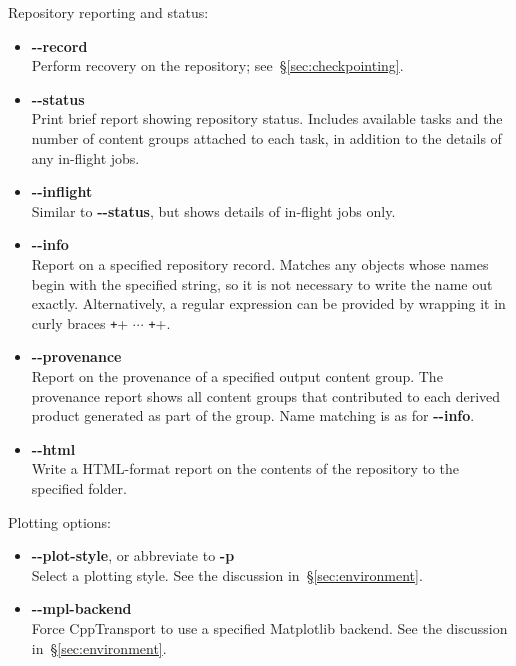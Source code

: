 \documentclass[11pt,a4paper]{article}
\newcommand{\packagefont}{\sffamily}
\newcommand{\CppTransport}{{\packagefont CppTransport}}
\newcommand{\Matplotlib}{{\packagefont Matplotlib}}
\newcommand{\option}[1]{{\ttfamily\bfseries\small #1}}
\begin{document}
\noindent Repository reporting and status:
\begin{itemize}
	\item \option{{-}{-}record} \\
	Perform recovery on the repository; see~\S\ref{sec:checkpointing}.
	
	\item \option{{-}{-}status} \\
	Print brief report showing repository status.
	Includes available tasks and the number of content groups
	attached to each task, in addition to the details of any
	in-flight jobs.
	
	\item \option{{-}{-}inflight} \\
	Similar to \option{{-}{-}status}, but shows details of in-flight jobs only.
	
	\item \option{{-}{-}info} \\
	Report on a specified repository record.
	Matches any objects whose names begin with the specified string, so it is
	not necessary to write the name out exactly.
	Alternatively, a regular expression can be provided by wrapping
	it in curly braces
	\texttt+{+ $\cdots$ \texttt+}+.
	
	\item \option{{-}{-}provenance} \\
	Report on the provenance of a specified output content group.
	The provenance report shows all content groups that contributed
	to each derived product generated as part of the group.
	Name matching is as for \option{{-}{-}info}.
	
	\item \option{{-}{-}html} \\
	Write a HTML-format report on the contents of the repository to
	the specified folder.
\end{itemize}

\noindent Plotting options:
\begin{itemize}
	\item \option{{-}{-}plot-style}, or abbreviate to \option{-p} \\
	Select a plotting style. See the discussion in~\S\ref{sec:environment}.	
	
	\item \option{{-}{-}mpl-backend} \\
	Force {\CppTransport} to use a specified {\Matplotlib} backend.
	See the discussion in~\S\ref{sec:environment}.
\end{itemize}
\end{document}
